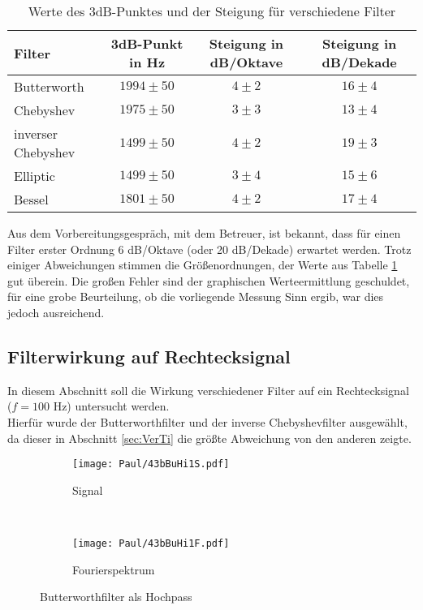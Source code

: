 \begin{table}[h]
    \centering
    \begin{tabular}[h]{l|c|c|c}
        Filter      & 3dB-Punkt in  Hz & Steigung in dB/Oktave & Steigung in dB/Dekade \\ \hline\hline
        Butterworth &    $1994\pm50$   &        $4\pm2$        &      $16\pm4$         \\ \hline
        Chebyshev   &    $1975\pm50$   &        $3\pm3$        &      $13\pm4$         \\ \hline
        inverser Chebyshev &$1499\pm50$&        $4\pm2$        &      $19\pm3$         \\ \hline
        Elliptic    &     $1499\pm50$  &        $3\pm4$        &      $15\pm6$         \\ \hline
        Bessel      &     $1801\pm50$  &        $4\pm2$        &      $17\pm4$         \\ \hline
    \end{tabular}
    \caption{Werte des 3dB-Punktes und der Steigung für verschiedene Filter}
    \label{tab:Stei}
\end{table}
Aus dem Vorbereitungsgespräch, mit dem Betreuer, ist bekannt, dass für einen Filter erster Ordnung 6 dB/Oktave (oder 20 dB/Dekade) erwartet werden. Trotz einiger Abweichungen stimmen die Größenordnungen, der Werte aus Tabelle \ref{tab:Stei} gut überein. Die großen Fehler sind der graphischen Werteermittlung geschuldet, für eine grobe Beurteilung, ob die vorliegende Messung Sinn ergib, war dies jedoch ausreichend.




\newpage
\subsection{Filterwirkung auf Rechtecksignal}
In diesem Abschnitt soll die Wirkung verschiedener Filter auf ein Rechtecksignal ($f=100$ Hz) untersucht werden.\\
Hierfür wurde der Butterworthfilter und der inverse Chebyshevfilter ausgewählt, da dieser in Abschnitt \ref{sec:VerTi} die größte Abweichung von den anderen zeigte.

\begin{figure}[h]
    \centering
    \begin{subfigure}{0.9\textwidth}
        \centering
        \texttt{[image: Paul/43bBuHi1S.pdf]}
        \caption{Signal}
    \end{subfigure}
    \\
    \begin{subfigure}{0.9\textwidth}
        \centering
        \texttt{[image: Paul/43bBuHi1F.pdf]}
        \caption{Fourierspektrum}
    \end{subfigure}
    \caption{Butterworthfilter als Hochpass}
    \label{fig:43bBuHi1}
\end{figure}

